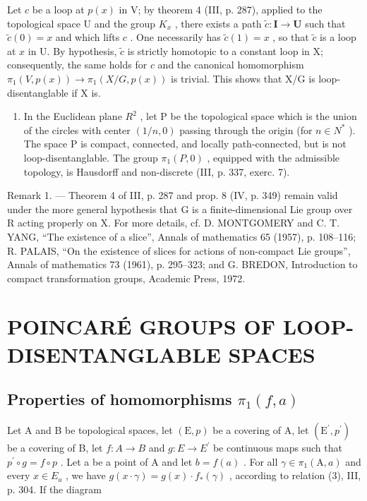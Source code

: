 Let \(c\) be a loop at \(p(x)\) in V; by theorem 4 (III, p. 287), applied to the topological space U and the group \(K_x\) , there exists a path \(\widetilde{c} \colon \mathbf{I} \to \mathbf{U}\) such that \(\widetilde{c}(0) = x\) and which lifts \(c\) . One necessarily has \(\widetilde{c}(1) = x\) , so that \(\widetilde{c}\) is a loop at \(x\) in U. By hypothesis, \(\widetilde{c}\) is strictly homotopic to a constant loop in X; consequently, the same holds for \(c\) and the canonical homomorphism \(\pi_1(V, p(x)) \to \pi_1(X/G, p(x))\) is trivial. This shows that X/G is loop-disentanglable if X is.

\begin{enumerate}
\def\labelenumi{\arabic{enumi})}
\setcounter{enumi}{4}
\tightlist
\item
  In the Euclidean plane \(R^{2}\) , let P be the topological space which is the union of the circles with center \((1/n,0)\) passing through the origin (for \(n \in N^{*}\) ). The space P is compact, connected, and locally path-connected, but is not loop-disentanglable. The group \(\pi_{1}(P,0)\) , equipped with the admissible topology, is Hausdorff and non-discrete (III, p. 337, exerc. 7).
\end{enumerate}

Remark 1. --- Theorem 4 of III, p. 287 and prop. 8 (IV, p. 349) remain valid under the more general hypothesis that G is a finite-dimensional Lie group over R acting properly on X. For more details, cf. D. MONTGOMERY and C. T. YANG, “The existence of a slice”, Annals of mathematics 65 (1957), p. 108--116; R. PALAIS, “On the existence of slices for actions of non-compact Lie groups”, Annals of mathematics 73 (1961), p. 295--323; and G. BREDON, Introduction to compact transformation groups, Academic Press, 1972.

\section{POINCARÉ GROUPS OF LOOP-DISENTANGLABLE SPACES}

\subsection{\texorpdfstring{Properties of homomorphisms \(\pi_{1}(f,a)\)}{Properties of homomorphisms pi\_1(f,a)}}

Let A and B be topological spaces, let \((\mathrm{E},p)\) be a covering of A, let \((\mathrm{E}^{\prime},p^{\prime})\) be a covering of B, let \(f\colon A\to B\) and \(g\colon E\to E^{\prime}\) be continuous maps such that \(p^{\prime}\circ g=f\circ p\) . Let a be a point of A and let \(b=f(a)\) . For all \(\gamma\in\pi_{1}(\mathrm{A},a)\) and every \(x\in E_{a}\) , we have \(g(x\cdot\gamma)=g(x)\cdot f_{*}(\gamma)\) , according to relation (3), III, p. 304. If the diagram

